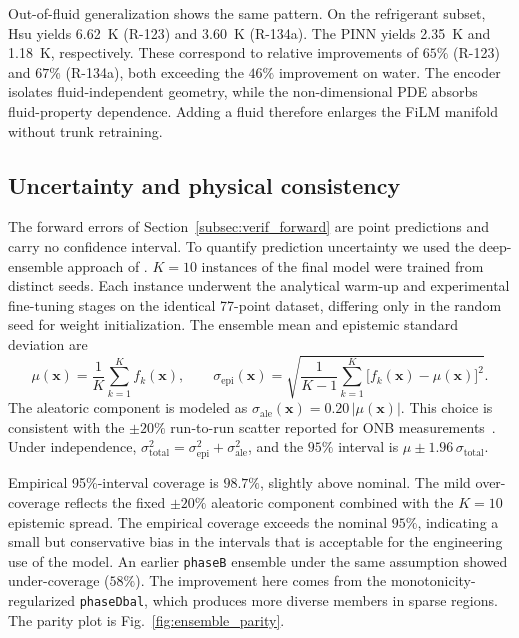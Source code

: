 Out-of-fluid generalization shows the same pattern. On the
refrigerant subset, Hsu yields \SI{6.62}{K} (R-123) and \SI{3.60}{K}
(R-134a). The PINN yields \SI{2.35}{K} and \SI{1.18}{K},
respectively. These correspond to relative improvements of $65\%$
(R-123) and $67\%$ (R-134a), both exceeding the $46\%$ improvement
on water. The encoder isolates fluid-independent geometry, while
the non-dimensional PDE absorbs fluid-property dependence. Adding a
fluid therefore enlarges the FiLM manifold without trunk retraining.

\subsection{Uncertainty and physical consistency}\label{subsec:uq_physics}\label{subsec:uq}\label{subsec:physics}

The forward errors of Section~\ref{subsec:verif_forward} are point
predictions and carry no confidence interval. To quantify prediction
uncertainty we used the deep-ensemble approach of
\citet{lakshminarayanan2017}. $K=10$ instances of the final model
were trained from distinct seeds. Each instance underwent the
analytical warm-up and experimental fine-tuning stages on the
identical 77-point dataset, differing only in the random seed for
weight initialization. The ensemble mean and epistemic standard
deviation are
\begin{equation}
  \mu(\mathbf{x}) = \frac{1}{K}\sum_{k=1}^{K} f_k(\mathbf{x}),
  \qquad
  \sigma_{\mathrm{epi}}(\mathbf{x}) = \sqrt{\frac{1}{K-1}\sum_{k=1}^{K}
    \bigl[f_k(\mathbf{x})-\mu(\mathbf{x})\bigr]^2}.
\end{equation}
The aleatoric component is modeled as
$\sigma_{\mathrm{ale}}(\mathbf{x}) = 0.20\,|\mu(\mathbf{x})|$. This
choice is consistent with the $\pm 20\%$ run-to-run scatter reported
for ONB measurements~\citep{basu2002,jones2009}. Under independence,
$\sigma_{\mathrm{total}}^2 = \sigma_{\mathrm{epi}}^2 +
\sigma_{\mathrm{ale}}^2$, and the $95\%$ interval is
$\mu\pm 1.96\,\sigma_{\mathrm{total}}$.

Empirical 95\%-interval coverage is $98.7\%$, slightly above
nominal. The mild over-coverage reflects the fixed $\pm 20\%$
aleatoric component combined with the $K=10$ epistemic spread. The
empirical coverage exceeds the nominal $95\%$, indicating a small
but conservative bias in the intervals that is acceptable for the
engineering use of the model. An earlier \texttt{phaseB} ensemble
under the same assumption showed under-coverage ($58\%$). The
improvement here comes from the monotonicity-regularized
\texttt{phaseDbal}, which produces more diverse members in sparse
regions. The parity plot is Fig.~\ref{fig:ensemble_parity}.

